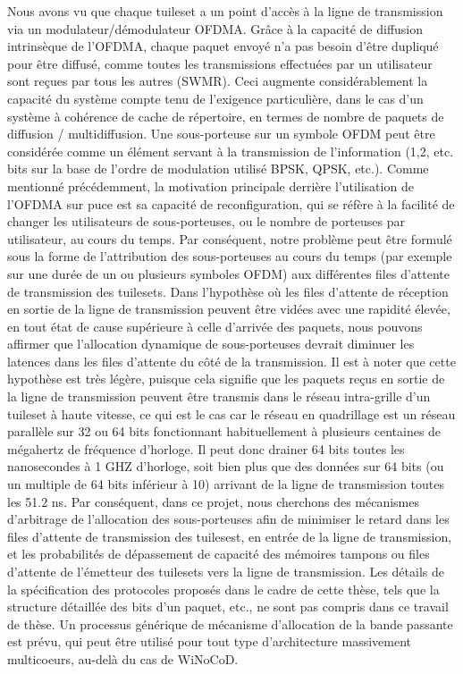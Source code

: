 Nous avons vu que chaque tuileset a un point d'accès à la ligne de transmission via un modulateur/démodulateur OFDMA. Grâce à la capacité de diffusion intrinsèque de l’OFDMA, chaque paquet envoyé n'a pas besoin d'être dupliqué pour être diffusé, comme toutes les transmissions effectuées par un utilisateur sont reçues par tous les autres (SWMR). Ceci augmente considérablement la capacité du système compte tenu de l'exigence particulière, dans le cas d'un système à cohérence de cache de répertoire, en termes de nombre de paquets de diffusion / multidiffusion. Une sous-porteuse sur un symbole OFDM peut être considérée comme un élément servant à la transmission de l'information (1,2, etc. bits sur la base de l'ordre de modulation utilisé BPSK, QPSK, etc.). Comme mentionné précédemment, la motivation principale derrière l'utilisation de l’OFDMA sur puce est sa capacité de reconfiguration, qui se réfère à la facilité de changer les utilisateurs de sous-porteuses, ou le nombre de porteuses par utilisateur, au cours du temps. Par conséquent, notre problème peut être formulé sous la forme de l'attribution des sous-porteuses au cours du temps (par exemple sur une durée de un ou plusieurs symboles OFDM) aux différentes files d'attente de transmission des tuilesets. Dans l'hypothèse où les files d'attente de réception en sortie de la ligne de transmission peuvent être vidées avec une rapidité élevée, en tout état de cause supérieure à celle d’arrivée des paquets, nous pouvons affirmer que l'allocation dynamique de sous-porteuses devrait diminuer les latences dans les files d'attente du côté de la transmission. Il est à noter que cette hypothèse est très légère, puisque cela signifie que les paquets reçus en sortie de la ligne de transmission peuvent être transmis dans le réseau intra-grille d’un tuileset à haute vitesse, ce qui est le cas car le réseau en quadrillage est un réseau parallèle sur 32 ou 64 bits fonctionnant habituellement à plusieurs centaines de mégahertz de fréquence d’horloge. Il peut donc drainer 64 bits toutes les nanosecondes à 1 GHZ d’horloge, soit bien plus que des données sur 64 bits (ou un multiple de 64 bits inférieur à 10) arrivant de la ligne de transmission toutes les 51.2 ns. Par conséquent, dans ce projet, nous cherchons des mécanismes d'arbitrage de l’allocation des sous-porteuses afin de minimiser le retard dans les files d'attente de transmission des tuilesest, en entrée de la ligne de transmission, et les probabilités de dépassement de capacité des mémoires tampons ou files d’attente de l’émetteur des tuilesets vers la ligne de transmission. Les détails de la spécification des protocoles proposés dans le cadre de cette thèse, tels que la structure détaillée des bits d’un paquet, etc., ne sont pas compris dans ce travail de thèse. Un processus générique de mécanisme d'allocation de la bande passante est prévu, qui peut être utilisé pour tout type d'architecture massivement multicoeurs, au-delà du cas de WiNoCoD.


